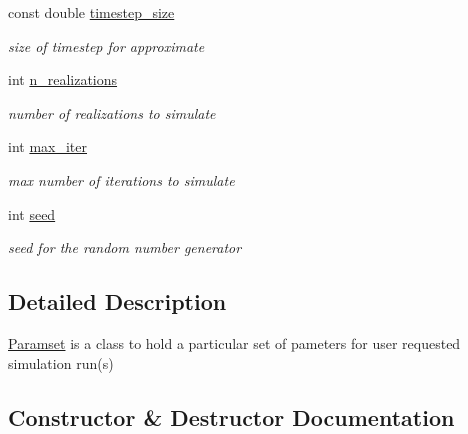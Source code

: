 \begin{DoxyCompactItemize}
\mbox{\label{class_paramset_a0554913cf803a67bc59ffdee154abc24}} 
const double \hyperlink{class_paramset_a0554913cf803a67bc59ffdee154abc24}{timestep\+\_\+size}
\begin{DoxyCompactList}\small\item\em size of timestep for approximate \end{DoxyCompactList}\item 
\mbox{\label{class_paramset_a50c0325e75983b66d0825406ec7873ac}} 
int \hyperlink{class_paramset_a50c0325e75983b66d0825406ec7873ac}{n\+\_\+realizations}
\begin{DoxyCompactList}\small\item\em number of realizations to simulate \end{DoxyCompactList}\item 
\mbox{\label{class_paramset_afeb86c327cd6966707996019609e6ed1}} 
int \hyperlink{class_paramset_afeb86c327cd6966707996019609e6ed1}{max\+\_\+iter}
\begin{DoxyCompactList}\small\item\em max number of iterations to simulate \end{DoxyCompactList}\item 
\mbox{\label{class_paramset_ab8a5866bb87cc2d78a69c47bacaeb06e}} 
int \hyperlink{class_paramset_ab8a5866bb87cc2d78a69c47bacaeb06e}{seed}
\begin{DoxyCompactList}\small\item\em seed for the random number generator \end{DoxyCompactList}\end{DoxyCompactItemize}


\subsection{Detailed Description}
\hyperlink{class_paramset}{Paramset} is a class to hold a particular set of pameters for user requested simulation run(s) 

\subsection{Constructor \& Destructor Documentation}
\mbox{\label{class_paramset_aa62d7992b29e74983af7d6026b7111c0}} 
